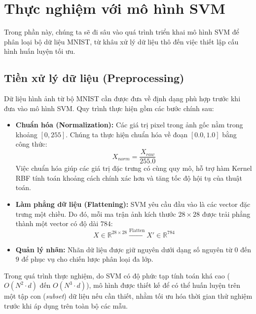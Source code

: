 \documentclass[../DoAn.tex]{subfiles}
\begin{document}
\section{Thực nghiệm với mô hình SVM}

Trong phần này, chúng ta sẽ đi sâu vào quá trình triển khai mô hình SVM để phân loại bộ dữ liệu MNIST, từ khâu xử lý dữ liệu thô đến việc thiết lập cấu hình huấn luyện tối ưu.
\\
\subsection{Tiền xử lý dữ liệu (Preprocessing)}

Dữ liệu hình ảnh từ bộ MNIST cần được đưa về định dạng phù hợp trước khi đưa vào mô hình SVM. Quy trình thực hiện gồm các bước chính sau:

\begin{itemize}
    \item \textbf{Chuẩn hóa (Normalization):} Các giá trị pixel trong ảnh gốc nằm trong khoảng $[0, 255]$. Chúng ta thực hiện chuẩn hóa về đoạn $[0.0, 1.0]$ bằng công thức:
    \begin{equation}
        X_{norm} = \frac{X_{raw}}{255.0}
    \end{equation}
    Việc chuẩn hóa giúp các giá trị đặc trưng có cùng quy mô, hỗ trợ hàm Kernel RBF tính toán khoảng cách chính xác hơn và tăng tốc độ hội tụ của thuật toán.
    
    \item \textbf{Làm phẳng dữ liệu (Flattening):} SVM yêu cầu đầu vào là các vector đặc trưng một chiều. Do đó, mỗi ma trận ảnh kích thước $28 \times 28$ được trải phẳng thành một vector có độ dài $784$:
    \begin{equation}
        X \in \mathbb{R}^{28 \times 28} \xrightarrow{\text{Flatten}} X' \in \mathbb{R}^{784}
    \end{equation}
    
    \item \textbf{Quản lý nhãn:} Nhãn dữ liệu được giữ nguyên dưới dạng số nguyên từ $0$ đến $9$ để phục vụ cho chiến lược phân loại đa lớp.
\end{itemize}

Trong quá trình thực nghiệm, do SVM có độ phức tạp tính toán khá cao ($O(N^2 \cdot d)$ đến $O(N^3 \cdot d)$), mô hình được thiết kế để có thể huấn luyện trên một tập con (\textit{subset}) dữ liệu nếu cần thiết, nhằm tối ưu hóa thời gian thử nghiệm trước khi áp dụng trên toàn bộ các mẫu.
\\
\end{document}
